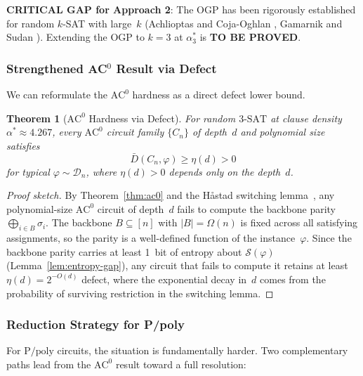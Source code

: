 \documentclass[11pt]{article}
\newtheorem{theorem}{Theorem}[section]
\theoremstyle{definition}
\theoremstyle{remark}
\newcommand{\calD}{\mathcal{D}}
\newcommand{\calS}{\mathcal{S}}
\newcommand{\Ppoly}{\mathrm{P/poly}}
\newcommand{\ACz}{\mathrm{AC}^0}
\newcommand{\threeSAT}{\mathrm{3\text{-}SAT}}
\begin{document}
\textbf{CRITICAL GAP for Approach 2}: The OGP has been rigorously
established for random $k$-SAT with large~$k$ (Achlioptas and
Coja-Oghlan \cite{ART}, Gamarnik and Sudan \cite{GS17}).  Extending
the OGP to $k = 3$ at $\alpha_3^*$ is \textbf{TO BE PROVED}.

\subsubsection{Strengthened AC$^0$ Result via Defect}

We can reformulate the $\ACz$ hardness as a direct defect lower bound.

\begin{theorem}[$\ACz$ Hardness via Defect]
\label{thm:ac0-defect}
For random $\threeSAT$ at clause density $\alpha^* \approx 4.267$,
every $\ACz$ circuit family $\{C_n\}$ of depth~$d$ and polynomial size
satisfies
\[
  \bar{D}(C_n, \varphi) \geq \eta(d) > 0
\]
for typical $\varphi \sim \calD_n$, where $\eta(d) > 0$ depends only
on the depth~$d$.
\end{theorem}

\begin{proof}[Proof sketch]
By Theorem~\ref{thm:ac0} and the H\aa stad switching lemma~\cite{Hastad},
any polynomial-size $\ACz$ circuit of depth~$d$ fails to compute the
backbone parity $\bigoplus_{i \in B} \sigma_i$.  The backbone
$B \subseteq [n]$ with $|B| = \Omega(n)$ is fixed across all satisfying
assignments, so the parity is a well-defined function of the instance~$\varphi$.
Since the backbone parity carries at least 1~bit of entropy about
$\calS(\varphi)$ (Lemma~\ref{lem:entropy-gap}), any circuit that fails to
compute it retains at least $\eta(d) = 2^{-O(d)}$ defect, where the
exponential decay in~$d$ comes from the probability of surviving
restriction in the switching lemma.
\end{proof}

\subsubsection{Reduction Strategy for P/poly}

For $\Ppoly$ circuits, the situation is fundamentally harder.
Two complementary paths lead from the $\ACz$ result toward a full
resolution:
\end{document}
